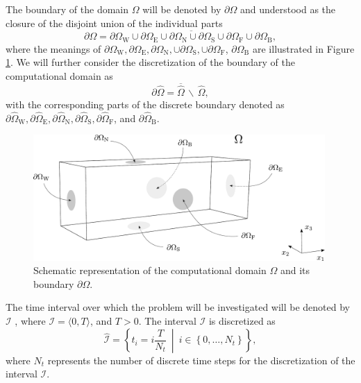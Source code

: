 The boundary of the domain $ \Omega $ will be denoted by $ \partial \Omega $ and understood as the closure of the disjoint union of the individual parts 
\begin{equation}\label{eq:border decomposition}
	\partial \Omega = \overline{\partial \Omega_{\mathrm{W}} \cup \partial \Omega_{\mathrm{E}} \cup \partial \Omega_{\mathrm{N}} \cup \partial \Omega_{\mathrm{S}} \cup \partial \Omega_{\mathrm{F}} \cup \partial \Omega_{\mathrm{B}}},
\end{equation}
where the meanings of $\partial \Omega_{\mathrm{W}} , \partial \Omega_{\mathrm{E}} , \partial \Omega_{\mathrm{N}}, \cup \partial \Omega_{\mathrm{S}}, \cup \partial \Omega_{\mathrm{F}}$, $  \partial \Omega_{\mathrm{B}} $ are illustrated in Figure \ref{fig:domain}. We will further consider the discretization of the boundary of the computational domain as
\begin{equation}\label{eq:border}
	\partial\hat{\Omega} = \overline{\hat{\Omega}} \, \backslash \, \hat{\Omega},
\end{equation}
with the corresponding parts of the discrete boundary denoted as $ \partial \hat{\Omega}_{\mathrm{W}} , \partial \hat{\Omega}_{\mathrm{E}} , \partial \hat{\Omega}_{\mathrm{N}}, \partial \hat{\Omega}_{\mathrm{S}}, \partial \hat{\Omega}_{\mathrm{F}}$,  and $ \partial \hat{\Omega}_{\mathrm{B}} $.
\begin{figure}[H]
	\centering
	\includegraphics[width=0.99\textwidth]{figures/omega.pdf}
	\caption{Schematic representation of the computational domain $ \Omega $ and its boundary $ \partial \Omega $.}  
	\label{fig:domain}
	\vspace{1.8mm}
\end{figure}

The time interval over which the problem will be investigated will be denoted by $ \mathcal{I} $ , where ${\mathcal{I} = \langle 0, T \rangle}$, and $ T > 0 $. The interval $ \mathcal{I} $ is discretized as
\begin{equation}\label{eq:timediscrete}
	\hat{\mathcal{I}} = \left\{ t_{i} = i \frac{T}{N_t} \ \middle| \ i \in \left\{0, \dots, N_{t} \right\} \right\},
\end{equation}
where $ N_t $ represents the number of discrete time steps for the discretization of the interval $ \mathcal{I} $.

